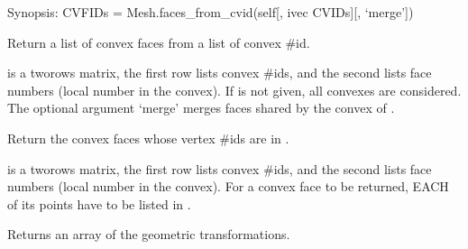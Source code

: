 \documentclass[a4paper,11pt,english]{sphinxmanual}
\begin{document}
\begin{fulllineitems}
\begin{fulllineitems}
\end{fulllineitems}


\begin{fulllineitems}
\label{\detokenize{python/cmdref_Mesh:getfem.Mesh.faces_from_cvid}}
Synopsis: CVFIDs = Mesh.faces\_from\_cvid(self{[}, ivec CVIDs{]}{[}, ‘merge’{]})

Return a list of convex faces from a list of convex \#id.

 is a two\sphinxhyphen{}rows matrix, the first row lists convex \#ids,
and the second lists face numbers (local number in the convex).
If  is not given, all convexes are considered. The optional
argument ‘merge’ merges faces shared by the convex of .

\end{fulllineitems}


\begin{fulllineitems}
\label{\detokenize{python/cmdref_Mesh:getfem.Mesh.faces_from_pid}}
Return the convex faces whose vertex \#ids are in .

 is a two\sphinxhyphen{}rows matrix, the first row lists convex \#ids,
and the second lists face numbers (local number in the convex).
For a convex face to be returned, EACH of its points have to be
listed in .

\end{fulllineitems}


\begin{fulllineitems}
\label{\detokenize{python/cmdref_Mesh:getfem.Mesh.geotrans}}
Returns an array of the geometric transformations.


\end{fulllineitems}
\end{fulllineitems}
\end{document}
